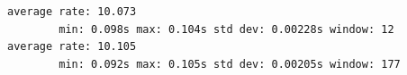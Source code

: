 \begin{lstlisting}[numbers=none, caption={Publication rate of /scan after lifting the USB current limit (excerpt).}, label={lst:scanhz}]
average rate: 10.073
        min: 0.098s max: 0.104s std dev: 0.00228s window: 12
average rate: 10.105
        min: 0.092s max: 0.105s std dev: 0.00205s window: 177
\end{lstlisting}

